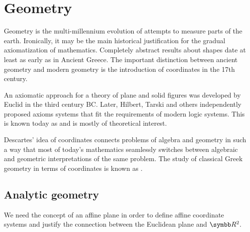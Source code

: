 \section{Geometry}\label{sec:geometry}

\begin{remark}\label{def:coordinates_in_geometry}
  Geometry is the multi-millennium evolution of attempts to measure parts of the earth. Ironically, it may be the main historical justification for the gradual axiomatization of mathematics. Completely abstract results about shapes date at least as early as in Ancient Greece. The important distinction between ancient geometry and modern geometry is the introduction of coordinates in the 17th century.

  An axiomatic approach for a theory of plane and solid figures was developed by Euclid in the third century BC. Later, Hilbert, Tarski and others independently proposed axioms systems that fit the requirements of modern logic systems. This is known today as  and is mostly of theoretical interest.

  Descartes' idea of coordinates connects problems of algebra and geometry in such a way that most of today's mathematics seamlessly switches between algebraic and geometric interpretations of the same problem. The study of classical Greek geometry in terms of coordinates is known as .
\end{remark}

\subsection{Analytic geometry}\label{subsec:analytic_geometry}

We need the concept of an affine plane in order to define affine coordinate systems and justify the connection between the Euclidean plane and \( \R^2 \).

